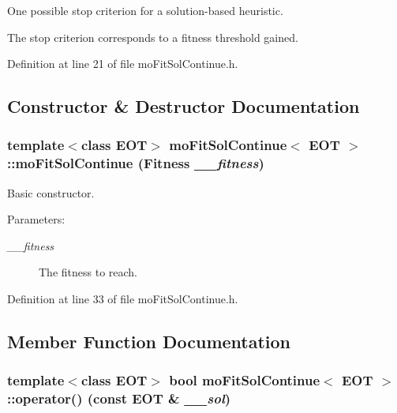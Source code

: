 One possible stop criterion for a solution-based heuristic. 

The stop criterion corresponds to a fitness threshold gained. 



Definition at line 21 of file moFitSolContinue.h.

\subsection{Constructor \& Destructor Documentation}
\subsubsection{\setlength{\rightskip}{0pt plus 5cm}template$<$class EOT$>$ {\bf moFitSolContinue}$<$ EOT $>$::{\bf moFitSolContinue} ({\bf Fitness} {\em \_\-\_\-fitness})\hspace{0.3cm}{\tt  [inline]}}\label{classmo_fit_sol_continue_b14f37ba88de4e12583b22f5aabeb682}


Basic constructor. 

\begin{Desc}
\item[Parameters:]
\begin{description}
\item[{\em \_\-\_\-fitness}]The fitness to reach. \end{description}
\end{Desc}


Definition at line 33 of file moFitSolContinue.h.

\subsection{Member Function Documentation}
\subsubsection{\setlength{\rightskip}{0pt plus 5cm}template$<$class EOT$>$ bool {\bf moFitSolContinue}$<$ EOT $>$::operator() (const EOT \& {\em \_\-\_\-sol})\hspace{0.3cm}{\tt  [inline, virtual]}}\label{classmo_fit_sol_continue_fa9f0a15f99c998115cae9b456403a27}



